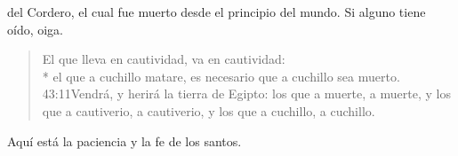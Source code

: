  del Cordero, el cual fue muerto desde el principio del mundo.
Si alguno tiene oído, oiga. 
\begin{verse}
El que lleva en cautividad, va en cautividad:\\* el que a cuchillo matare, es necesario que a cuchillo sea muerto.%
					{43:11}{Vendrá, y herirá la tierra de Egipto: los que a muerte, a muerte, y los que a cautiverio, a cautiverio, y los que a cuchillo, a cuchillo.}%
\end{verse}

\noindent
Aquí está la paciencia y la fe de los santos.
